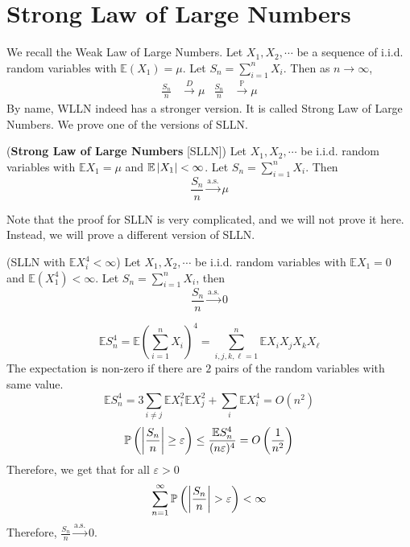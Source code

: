 \documentclass{huhtakm-template-book}
\newcommand{\prob}{\mathbb{P}}
\newcommand{\expect}{\mathbb{E}}
\begin{document}
\section{Strong Law of Large Numbers}
We recall the Weak Law of Large Numbers. Let $X_{1},X_{2},\cdots$ be a sequence of i.i.d. random variables with $\expect(X_{1})=\mu$. Let $S_{n}=\sum_{i=1}^{n}X_{i}$. Then as $n\to\infty$,
\begin{align*}
	\frac{S_{n}}{n}&\xrightarrow{D}\mu & \frac{S_{n}}{n}&\xrightarrow{\prob}\mu
\end{align*}
By name, WLLN indeed has a stronger version. It is called Strong Law of Large Numbers. We prove one of the versions of SLLN.
\begin{thm}(\textbf{Strong Law of Large Numbers} [SLLN])
	Let $X_{1},X_{2},\cdots$ be i.i.d. random variables with $\expect X_{1}=\mu$ and $\expect\abs{X_{1}}<\infty$. Let $S_{n}=\sum_{i=1}^{n}X_{i}$. Then
	\begin{equation*}
		\frac{S_{n}}{n}\xrightarrow{\text{a.s.}}\mu
	\end{equation*}
\end{thm}
Note that the proof for SLLN is very complicated, and we will not prove it here. Instead, we will prove a different version of SLLN.
\newpage
\begin{thm}(SLLN with $\expect X_{i}^{4}<\infty$)
	Let $X_{1},X_{2},\cdots$ be i.i.d. random variables with $\expect X_{1}=0$ and $\expect(X_{1}^{4})<\infty$. Let $S_{n}=\sum_{i=1}^{n}X_{i}$, then
	\begin{equation*}
		\frac{S_{n}}{n}\xrightarrow{\text{a.s.}}0
	\end{equation*}
\end{thm}
\begin{proofing}
	\begin{equation*}
		\expect S_{n}^{4}=\expect\left(\sum_{i=1}^{n}X_{i}\right)^{4}=\sum_{i,j,k,\ell=1}^{n}\expect X_{i}X_{j}X_{k}X_{\ell}
	\end{equation*}
	The expectation is non-zero if there are $2$ pairs of the random variables with same value.
	\begin{equation*}
		\expect S_{n}^{4}=3\sum_{i\neq j}\expect X_{i}^{2}\expect X_{j}^{2}+\sum_{i}\expect X_{i}^{4}=O(n^{2})
	\end{equation*}
	\begin{equation*}
		\prob\left(\abs{\frac{S_{n}}{n}}\geq\varepsilon\right)\leq\frac{\expect S_{n}^{4}}{(n\varepsilon)^{4}}=O\left(\frac{1}{n^{2}}\right)
	\end{equation*}
	Therefore, we get that for all $\varepsilon>0$
	\begin{equation*}
		\sum_{n=1}^{\infty}\prob\left(\abs{\frac{S_{n}}{n}}>\varepsilon\right)<\infty
	\end{equation*}
	Therefore, $\frac{S_{n}}{n}\xrightarrow{\text{a.s.}}0$.
\end{proofing}
\end{document}
